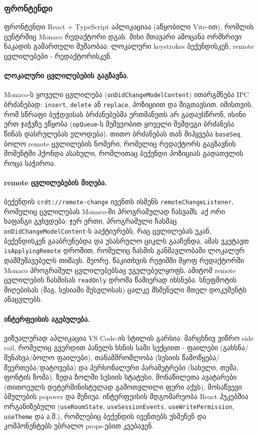 \subsubsection{ფრონტენდი}

ფრონტენდი React + TypeScript აპლიკაციაა (აწყობილი Vite-ით), რომლის
ცენტრშიც Monaco რედაქტორი დგას. მისი მთავარი ამოცანა ორმხრივი ნაკადის
გამართული მუშაობაა: ლოკალური keystrokes ბექენდისკენ, remote
ცვლილებები - რედაქტორისკენ.

\paragraph{ლოკალური ცვლილებების გაგზავნა.}
Monaco-ს ყოველი ცვლილება (\texttt{onDidChangeModelContent})
ითარგმნება IPC ბრძანებად: \texttt{insert}, \texttt{delete} ან
\texttt{replace}, პოზიციით და შიგთავსით. იმისთვის, რომ სწრაფი ბეჭდვისას
ბრძანებებმა ერთმანეთს არ გადაუსწრონ, ისინი ერთ ჯაჭვზე ეწყობა
(\texttt{opQueue}-ს მეშვეობით ყოველი შემდეგი ბრძანება წინას დასრულებას ელოდება).
თითო ბრძანებას თან მიჰყვება \texttt{baseSeq}, ბოლო remote ცვლილების
ნომერი, რომელიც რედაქტორს გაგზავნის მომენტში ჰქონდა ასახული, რომლითაც
ბექენდი პოზიციას გადათვლის როცა საჭიროა.

\paragraph{remote ცვლილებების მიღება.}
ბექენდის \texttt{crdt://remote-change} ივენთს ისმენს
\texttt{remoteChangeListener}, რომელიც ცვლილებას Monaco-ში პროგრამულად
ჩასვამს. აქ ორი ხაფანგი გვხვდება: ჯერ ერთი, პროგრამული ჩასმაც
\texttt{onDidChangeModelContent}-ს ააქტიურებს, რაც ცვლილებას უკან,
ბექენდისკენ გააბრუნებდა და უსასრულო ციკლს გააჩენდა, ამას ვკეტავთ
\texttt{isApplyingRemote} დროშით, რომელიც ჩასმის განმავლობაში ლოკალურ
დამმუშავებელს თიშავს. მეორე, წაკითხვის რეჟიმში მყოფ რედაქტორში Monaco
პროგრამულ ცვლილებებსაც უგულებელყოფს, ამიტომ remote ცვლილების ჩასმისას
\texttt{readOnly} დროშა წამიერად იხსნება. სნეფშოტის მიღებისას (მაგ.
სესიაში შესვლისას) ცალკე მსმენელი მთელ დოკუმენტს ანაცვლებს.

\paragraph{ინტერფეისის აგებულება.}
ვიზუალურად აპლიკაცია VS Code-ის სტილის გარსია: მარცხნივ ვიწრო 
side rail, რომელიც გვერდით პანელს ხსნის სამი სექციით -
ფაილები (გახსნა/შენახვა/ბოლო ფაილები), თანამშრომლობა (სესიის
წამოწყება/შეერთება/დატოვება) და პერსონალური პარამეტრები (სახელი, თემა,
ფონტის ზომა). ზედა ზოლში სესიის სტატუსი, მონაწილეთა ავატარები
(თითოეულს დეტერმინისტულად გამოთვლილი ფერი აქვს), მოსაწვევი ბმულების
popover და მენიუა. ინტერფეისის მდგომარეობა React ჰუკებშია
ორგანიზებული (\texttt{useRoomState}, \texttt{useSessionEvents},
\texttt{useWritePermission}, \texttt{useTheme} და ა.შ.), რომლებიც
ბექენდის ივენთებს უსმენენ და კომპონენტებს უბრალო props-ებით კვებავენ.

